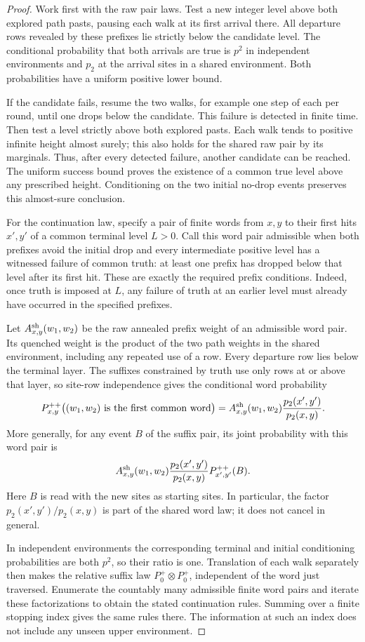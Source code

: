 \begin{proof}
Work first with the raw pair laws. Test a new integer level above both
explored path pasts, pausing each walk at its first arrival there. All
departure rows revealed by these prefixes lie strictly below the
candidate level. The conditional probability that both arrivals are
true is \(p^2\) in independent environments and \(p_2\) at the arrival
sites in a shared environment. Both probabilities have a uniform
positive lower bound.

If the candidate fails, resume the two walks, for example one step of
each per round, until one drops below the candidate. This failure is
detected in finite time. Then test a level strictly above both explored
pasts. Each walk tends to positive infinite height almost surely; this
also holds for the shared raw pair by its marginals. Thus, after every
detected failure, another candidate can be reached. The uniform success
bound proves the existence of a common true level above any prescribed
height. Conditioning on the two initial no-drop events preserves this
almost-sure conclusion.

For the continuation law, specify a pair of finite words from \(x,y\)
to their first hits \(x',y'\) of a common terminal level \(L>0\).
Call this word pair admissible when both prefixes avoid the initial
drop and every intermediate positive level has a witnessed failure of
common truth: at least one prefix has dropped below that level after its
first hit. These are exactly the required prefix conditions. Indeed,
once truth is imposed at \(L\), any failure of truth at an earlier level
must already have occurred in the specified prefixes.

Let \(A_{x,y}^{\rm sh}(w_1,w_2)\) be the raw annealed prefix weight of an
admissible word pair. Its quenched weight is the product of the two path
weights in the shared environment, including any repeated use of a row.
Every departure row lies below the terminal layer. The suffixes
constrained by truth use only rows at or above that layer, so site-row
independence gives the conditional word probability
\[
P_{x,y}^{++}\bigl((w_1,w_2)\text{ is the first common word}\bigr)
 =
 A_{x,y}^{\rm sh}(w_1,w_2)
 \frac{p_2(x',y')}{p_2(x,y)}.
\]
More generally, for any event \(B\) of the suffix pair, its joint
probability with this word pair is
\[
A_{x,y}^{\rm sh}(w_1,w_2)
\frac{p_2(x',y')}{p_2(x,y)}
P_{x',y'}^{++}(B).
\]
Here \(B\) is read with the new sites as starting sites. In particular,
the factor \(p_2(x',y')/p_2(x,y)\) is part of the shared word law; it
does not cancel in general.

In independent environments the corresponding terminal and initial
conditioning probabilities are both \(p^2\), so their ratio is one.
Translation of each walk separately then makes the relative suffix law
\(P_0^+\otimes P_0^+\), independent of the word just traversed. Enumerate
the countably many admissible finite word pairs and iterate these
factorizations to obtain the stated continuation rules. Summing over a
finite stopping index gives the same rules there. The information at
such an index does not include any unseen upper environment.
\end{proof}

